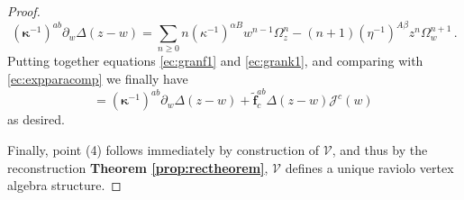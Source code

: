 \documentclass[10pt,a4paper]{amsart}
\begin{document}
\begin{proof}
\begin{equation}
\label{ec:grank1}
    (\bm{\kappa}^{-1})^{ab}\partial_w\Delta(z-w)=\sum_{n\geq 0} n(\kappa^{-1})^{\alpha B}w^{n-1}\Omega_z^n - (n+1)(\eta^{-1})^{A\beta}z^n\Omega_w^{n+1}\,.
\end{equation}
Putting together equations \eqref{ec:granf1} and \eqref{ec:grank1}, and comparing with \eqref{ec:expparacomp} we finally have 
\begin{equation}
    [\mathcal{J}^a(z),\mathcal{J}^b(w)]= (\bm{\kappa}^{-1})^{ab}\partial_w\Delta(z-w) + \mathbf{\tilde f}^{ab}_c\Delta(z-w)\mathcal{J}^c(w)\,
    \label{commutator}
\end{equation}
as desired.


\medskip

Finally, point (4) follows immediately by construction of $\mathcal{V}$, and thus by the reconstruction \textbf{Theorem \ref{prop:rectheorem}}, $\mathcal{V}$ defines a unique raviolo vertex algebra structure.


\end{proof}
\end{document}

